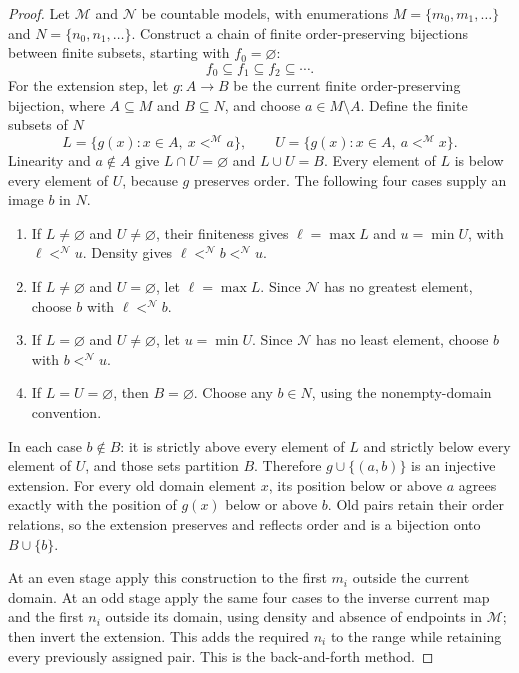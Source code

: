 \begin{proof}
Let \(\mathcal M\) and \(\mathcal N\) be countable models, with enumerations
\(M=\{m_0,m_1,\ldots\}\) and \(N=\{n_0,n_1,\ldots\}\).  Construct a chain of
finite order-preserving bijections between finite subsets, starting with
\(f_0=\varnothing\):
\[
  f_0\subseteq f_1\subseteq f_2\subseteq\cdots.
\]
For the extension step, let \(g:A\to B\) be the current finite
order-preserving bijection, where \(A\subseteq M\) and \(B\subseteq N\),
and choose \(a\in M\setminus A\).  Define the finite subsets of \(N\)
\[
 L=\{g(x):x\in A,\ x<^{\mathcal M}a\},\qquad
 U=\{g(x):x\in A,\ a<^{\mathcal M}x\}.
\]
Linearity and \(a\notin A\) give \(L\cap U=\varnothing\) and
\(L\cup U=B\).  Every element of \(L\) is below every element of
\(U\), because \(g\) preserves order.  The following four cases supply
an image \(b\) in \(N\).
\begin{enumerate}
  \item If \(L\ne\varnothing\) and \(U\ne\varnothing\), their
        finiteness gives \(\ell=\max L\) and \(u=\min U\), with
        \(\ell<^{\mathcal N}u\).  Density gives
        \(\ell<^{\mathcal N}b<^{\mathcal N}u\).
  \item If \(L\ne\varnothing\) and \(U=\varnothing\), let
        \(\ell=\max L\).  Since \(\mathcal N\) has no greatest
        element, choose \(b\) with \(\ell<^{\mathcal N}b\).
  \item If \(L=\varnothing\) and \(U\ne\varnothing\), let
        \(u=\min U\).  Since \(\mathcal N\) has no least
        element, choose \(b\) with \(b<^{\mathcal N}u\).
  \item If \(L=U=\varnothing\), then \(B=\varnothing\).
        Choose any \(b\in N\), using the nonempty-domain convention.
\end{enumerate}
In each case \(b\notin B\): it is strictly above every element of
\(L\) and strictly below every element of \(U\), and those sets
partition \(B\).  Therefore \(g\cup\{(a,b)\}\) is an injective
extension.  For every old domain element \(x\), its position below or
above \(a\) agrees exactly with the position of \(g(x)\) below or
above \(b\).  Old pairs retain their order relations, so the extension
preserves and reflects order and is a bijection onto \(B\cup\{b\}\).

At an even stage apply this construction to the first \(m_i\) outside
the current domain.  At an odd stage apply the same four cases to the
inverse current map and the first \(n_i\) outside its domain, using
density and absence of endpoints in \(\mathcal M\); then invert the
extension.  This adds the required \(n_i\) to the range while retaining
every previously assigned pair.  This is the back-and-forth method.


\end{proof}
